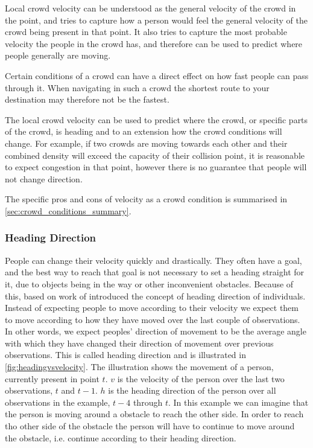 Local crowd velocity can be understood as the general velocity of the crowd in the point, and tries to capture how a person would feel the general velocity of the crowd being present in that point. It also tries to capture the most probable velocity the people in the crowd has, and therefore can be used to predict where people generally are moving.

Certain conditions of a crowd can have a direct effect on how fast people can pass through it. When navigating in such a crowd the shortest route to your destination may therefore not be the fastest.

The local crowd velocity can be used to predict where the crowd, or specific parts of the crowd, is heading and to an extension how the crowd conditions will change. For example, if two crowds are moving towards each other and their combined density will exceed the capacity of their collision point, it is reasonable to expect congestion in that point, however there is no guarantee that people will not change direction. 


The specific pros and cons of velocity as a crowd condition is summarised in \cref{sec:crowd_conditions_summary}.

\subsubsection{Heading Direction}\label{subsubsec:headingDirection}
People can change their velocity quickly and drastically. They often have a goal, and the best way to reach that goal is not necessary to set a heading straight for it, due to objects being in the way or other inconvenient obstacles. Because of this, \citet{wirz2012inferring} based on work of \citet{localTrendStatistics} introduced the concept of heading direction of individuals. Instead of expecting people to move according to their velocity we expect them to move according to how they have moved over the last couple of observations. In other words, we expect peoples' direction of movement to be the average angle with which they have changed their direction of movement over previous observations. This is called heading direction and is illustrated in \cref{fig:headingvsvelocity}. The illustration shows the movement of a person, currently present in point $t$. $v$ is the velocity of the person over the last two observations, $t$ and $t-1$. $h$ is the heading direction of the person over all observations in the example, $t-4$ through $t$. In this example we can imagine that the person is moving around a obstacle to reach the other side. In order to reach tho other side of the obstacle the person will have to continue to move around the obstacle, i.e. continue according to their heading direction.


